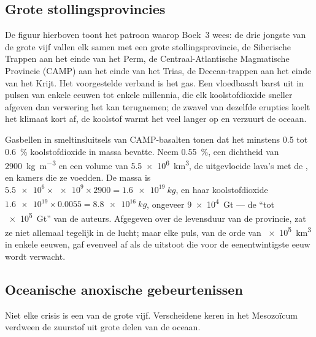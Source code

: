 \subsection*{Grote stollingsprovincies}

De figuur hierboven toont het patroon waarop Boek~3 wees: de drie jongste van
de grote vijf vallen elk samen met een grote stollingsprovincie, de Siberische Trappen aan het einde van het Perm,
de Centraal-Atlantische Magmatische Provincie (CAMP) aan het einde van het Trias, de Deccan-trappen aan het
einde van het Krijt. Het voorgestelde verband is het gas. Een vloedbasalt barst uit in pulsen van enkele
eeuwen tot enkele millennia, die elk koolstofdioxide sneller afgeven dan verwering het kan
terugnemen; de zwavel van dezelfde erupties koelt het klimaat kort af, de koolstof warmt het veel
langer op en verzuurt de oceaan.

\begin{example}\label{ex:b2:phanerozoic-earth:camp}
Gasbellen in smeltinsluitsels van CAMP-basalten tonen dat het  minstens 0.5 tot
\qty{0.6}{\percent} koolstofdioxide in massa bevatte. Neem \qty{0.55}{\percent}, een dichtheid van
\qty{2900}{kg.m^{-3}} en een volume van \qty{5.5e6}{km^3}, de uitgevloeide lava's met de , 
en kamers die ze voedden. De massa  is $\num{5.5e6} \times \num{e9} \times 2900 =
\qty{1.6e19}{kg}$, en haar koolstofdioxide $\num{1.6e19} \times 0.0055 = \qty{8.8e16}{kg}$, ongeveer
\qty{9e4}{Gt} --- de ``tot \qty{e5}{Gt}'' van de auteurs. Afgegeven over de levensduur van de provincie,
zat ze niet allemaal tegelijk in de lucht; maar elke puls, van de orde van \qty{e5}{km^3} in enkele
eeuwen, gaf evenveel af als de uitstoot die voor de eenentwintigste eeuw wordt verwacht.
\end{example}

\subsection*{Oceanische anoxische gebeurtenissen}

Niet elke crisis is een van de grote vijf. Verscheidene keren in het Mesozoïcum verdween de zuurstof uit
grote delen van de oceaan.

